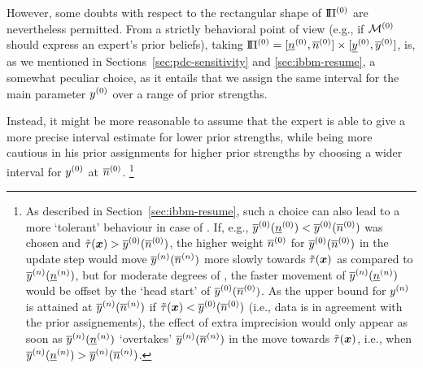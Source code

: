 However, some doubts with respect to the rectangular shape of $\text{I}\!\Pi^{(0)}$ are nevertheless permitted.
From a strictly behavioral point of view
(e.g., if $\mathcal{M}^{(0)}$ should express an expert's prior beliefs),
taking $\text{I}\!\Pi^{(0)} = [\underline{n}^{(0)}, \overline{n}^{(0)}] \times [\underline{y}^{(0)}, \overline{y}^{(0)}]$,
is, as we mentioned in Sections~\ref{sec:pdc-sensitivity} and \ref{sec:ibbm-resume}, a somewhat peculiar choice,
as it entails that we assign the same interval for the main parameter $y^{(0)}$
over a range of prior strengths.

Instead, it might be more reasonable to assume that the expert is able to give
a more precise interval estimate for lower prior strengths,
while being more cautious in his prior assignments for higher prior strengths
by choosing a wider interval for $y^{(0)}$ at $\overline{n}^{(0)}$.%
\footnote{As described in Section~\ref{sec:ibbm-resume},
such a choice can also lead to a more `tolerant' behaviour in case of \pdc.
If, e.g., $\overline{y}^{(0)}(\underline{n}^{(0)}) < \overline{y}^{(0)}(\overline{n}^{(0)})$ was chosen and $\tilde{\tau}({\bm x}) > \overline{y}^{(0)}(\overline{n}^{(0)})$,
the higher weight $\overline{n}^{(0)}$ for $\overline{y}^{(0)}(\overline{n}^{(0)})$ in the update step
would move $\overline{y}^{(n)}(\overline{n}^{(n)})$ more slowly towards $\tilde{\tau}({\bm x})$ as compared to $\overline{y}^{(n)}(\underline{n}^{(n)})$,
but for moderate degrees of \pdc, the faster movement of $\overline{y}^{(n)}(\underline{n}^{(n)})$
would be offset by the `head start' of $\overline{y}^{(0)}(\overline{n}^{(0)})$.
As the upper bound for $y^{(n)}$ is attained at $\overline{y}^{(n)}(\overline{n}^{(n)})$
if $\tilde{\tau}({\bm x}) < \overline{y}^{(0)}(\overline{n}^{(0)})$ (i.e., data is in agreement with the prior assignements),
the effect of extra imprecision would only appear as soon as
$\overline{y}^{(n)}(\underline{n}^{(n)})$ `overtakes' $\overline{y}^{(n)}(\overline{n}^{(n)})$ in the move towards $\tilde{\tau}({\bm x})$, i.e., when $\overline{y}^{(n)}(\underline{n}^{(n)}) > \overline{y}^{(n)}(\overline{n}^{(n)})$.}


